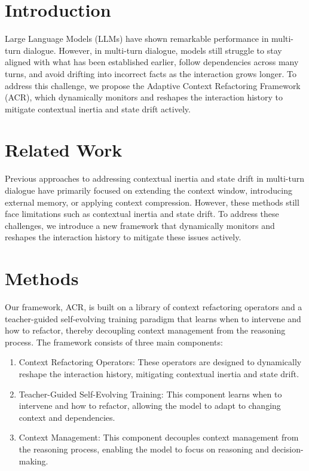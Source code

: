 \documentclass[12pt, oneside]{article}
\begin{document}
\section{Introduction}

Large Language Models (LLMs) have shown remarkable performance in multi-turn dialogue. However, in multi-turn dialogue, models still struggle to stay aligned with what has been established earlier, follow dependencies across many turns, and avoid drifting into incorrect facts as the interaction grows longer. To address this challenge, we propose the Adaptive Context Refactoring Framework (ACR), which dynamically monitors and reshapes the interaction history to mitigate contextual inertia and state drift actively.

\section{Related Work}

Previous approaches to addressing contextual inertia and state drift in multi-turn dialogue have primarily focused on extending the context window, introducing external memory, or applying context compression. However, these methods still face limitations such as contextual inertia and state drift. To address these challenges, we introduce a new framework that dynamically monitors and reshapes the interaction history to mitigate these issues actively.

\section{Methods}

Our framework, ACR, is built on a library of context refactoring operators and a teacher-guided self-evolving training paradigm that learns when to intervene and how to refactor, thereby decoupling context management from the reasoning process. The framework consists of three main components:

\begin{enumerate}
\item Context Refactoring Operators: These operators are designed to dynamically reshape the interaction history, mitigating contextual inertia and state drift.
\item Teacher-Guided Self-Evolving Training: This component learns when to intervene and how to refactor, allowing the model to adapt to changing context and dependencies.
\item Context Management: This component decouples context management from the reasoning process, enabling the model to focus on reasoning and decision-making.
\end{enumerate}
\end{document}
